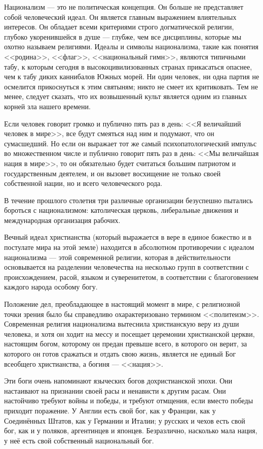 Национализм — это не политическая концепция. Он больше не представляет собой человеческий идеал. Он является главным выражением влиятельных интересов. Он обладает всеми критериями строго догматической религии, глубоко укоренившейся в душе — глубже, чем все дисциплины, которые мы охотно называем религиями. Идеалы и символы национализма, такие как понятия <<родина>>, <<флаг>>, <<национальный гимн>>, являются типичными табу, к которым сегодня в высокоцивилизованных странах прикасаться опаснее, чем к табу диких каннибалов Южных морей. Ни один человек, ни одна партия не осмелится прикоснуться к этим святыням; никто не смеет их критиковать. Тем не менее, следует сказать, что их возвышенный культ является одним из главных корней зла нашего времени.

Если человек говорит громко и публично пять раз в день: <<Я величайший человек в мире>>, все будут смеяться над ним и подумают, что он сумасшедший. Но если он выражает тот же самый психопатологический импульс во множественном числе и публично говорит пять раз в день: <<Мы величайшая нация в мире>>, то он обязательно будет считаться большим патриотом и государственным деятелем, и он вызовет восхищение не только своей собственной нации, но и всего человеческого рода.

В течение прошлого столетия три различные организации безуспешно пытались бороться с национализмом: католическая церковь, либеральные движения и международная организация рабочих.

Вечный идеал христианства (который выражается в вере в единое божество и в постулате мира на этой земле) находится в абсолютном противоречии с идеалом национализма — этой современной религии, которая в действительности основывается на разделении человечества на несколько групп в соответствии с происхождением, расой, языком и суверенитетом, в соответствии с благоговением каждого народа особому богу.

Положение дел, преобладающее в настоящий момент в мире, с религиозной точки зрения было бы справедливо охарактеризовано термином <<политеизм>>. Современная религия национализма вытеснила христианскую веру из души человека, и хотя он ходит на мессу и посещает церемонии христианской церкви, настоящим богом, которому он предан превыше всего, в которого он верит, за которого он готов сражаться и отдать свою жизнь, является не единый Бог всеобщего христианства, а богиня — <<нация>>.

Эти боги очень напоминают языческих богов дохристианской эпохи. Они настаивают на признании своей расы и ненависти к другим расам. Они настойчиво требуют войны и победы, и требуют отмщения, если вместо победы приходит поражение. У Англии есть свой бог, как у Франции, как у Соединённых Штатов, как у Германии и Италии; у русских и чехов есть свой бог, как и у поляков, аргентинцев и японцев. Безразлично, насколько мала нация, у неё есть свой собственный национальный бог.

